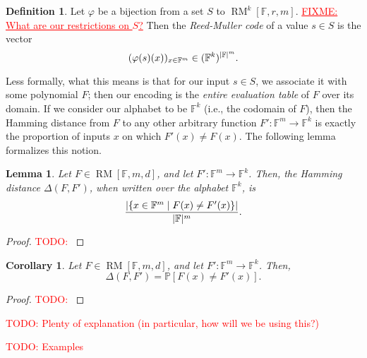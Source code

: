 \documentclass[english,12pt]{reedthesis}
\theoremstyle{plain}
\newtheorem{lemma}[lemma]{Lemma}
\newtheorem{cor}[cor]{Corollary}
\theoremstyle{definition}
\newtheorem{defn}[defn]{Definition}
\theoremstyle{remark}
\DeclareMathOperator{\RM}{RM}
\DeclarePairedDelimiter{\abs}{\lvert}{\rvert}
\newcommand{\TODO}[1]{\textcolor{red}{TODO: #1}}
\newcommand{\FIXME}[1]{\textcolor{red}{\ul{FIXME: #1}}}
\begin{document}
\begin{defn}\label{def:rm-code}
  Let $\varphi$ be a bijection from a set $S$ to $\RM^{k}[\mathbb{F}, r, m]$.
  \FIXME{What are our restrictions on $S$?} Then the \emph{Reed-Muller code} of
  a value $s \in S$ is the vector
  \begin{equation}
    (\varphi(s)(x))_{x \in \mathbb{F}^{m}} \in (\mathbb{F}^{k})^{\abs{\mathbb{F}}^{m}}.
  \end{equation}
\end{defn}

Less formally, what this means is that for our input $s \in S$, we associate it
with some polynomial $F$; then our encoding is the \emph{entire evaluation
  table} of $F$ over its domain. If we consider our alphabet to be
$\mathbb{F}^{k}$ (i.e., the codomain of $F$), then the Hamming distance from $F$
to any other arbitrary function $F'\colon \mathbb{F}^{m} \rightarrow \mathbb{F}^{k}$ is exactly
the proportion of inputs $x$ on which $F'(x) \ne F(x)$. The following lemma
formalizes this notion.

\begin{lemma}\label{lem:rm-distance}
  Let $F \in \RM[\mathbb{F}, m, d]$, and let
  $F'\colon \mathbb{F}^{m} \rightarrow \mathbb{F}^{k}$. Then, the Hamming distance $\Delta(F, F')$,
  when written over the alphabet $\mathbb{F}^{k}$, is
  \begin{equation}\label{eqn:rm-distance}
    \frac{\abs*{\{x \in \mathbb{F}^{m} \mid F(x) \ne F'(x)\}}}{\abs{\mathbb{F}}^{m}}.
  \end{equation}
\end{lemma}

\begin{proof}
  \TODO{}
\end{proof}

\begin{cor}\label{cor:rm-probability}
  Let $F \in \RM[\mathbb{F}, m, d]$, and let
  $F'\colon \mathbb{F}^{m} \rightarrow \mathbb{F}^{k}$. Then,
  \begin{equation}
    \Delta(F, F') = \mathbb{P}[F(x) \ne F'(x)].
  \end{equation}
\end{cor}

\begin{proof}
  \TODO{}
\end{proof}

\TODO{Plenty of explanation (in particular, how will we be using this?)}

\TODO{Examples}
\end{document}
